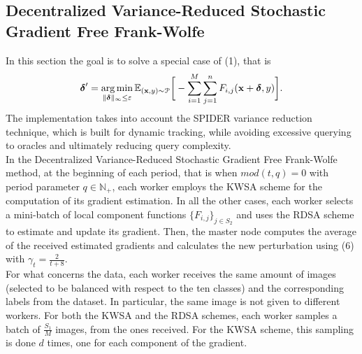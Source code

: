 \subsection{Decentralized Variance-Reduced Stochastic Gradient Free Frank-Wolfe}
In this section the goal is to solve a special case of (1), that is
\begin{equation}
	\mbox{\boldmath$ \delta$}' = \operatorname*{arg\,min}_{\lVert \mbox{\boldmath$\scriptstyle \delta$}\rVert_{\infty}\leq\varepsilon} \mathbb{E}_{(\mathbf{x},y)\sim \mathcal{P}}\bigg[-\sum_{i=1}^M \sum_{j=1}^n F_{i,j}(\mathbf{x}+\mbox{\boldmath$ \delta$},y)\bigg].
\end{equation}
The implementation takes into account the SPIDER variance reduction technique, which is built for dynamic tracking, while avoiding excessive querying to oracles and ultimately reducing query complexity.\\
In the Decentralized Variance-Reduced Stochastic Gradient Free Frank-Wolfe method,
at the beginning of each period, that is when $mod(t,q)=0$ with period parameter $q \in \mathbb{N}_{+}$, each worker employs the KWSA scheme for the computation of its gradient estimation. In all the other cases, each worker selects a mini-batch of local component functions $\{F_{i,j}\}_{j\in S_2}$ and uses the RDSA scheme to estimate and update its gradient. Then, the master node computes the average of the received estimated gradients and calculates the new perturbation using (6) with $\gamma_t = \frac{2}{t+8}$.\\
For what concerns the data, each worker receives the same amount of images (selected to be balanced with respect to the ten classes) and the corresponding labels from the dataset. In particular, the same image is not given to different workers. For both the KWSA and the RDSA schemes, each worker samples a batch of $\frac{S_1}{M}$ images, from the ones received. For the KWSA scheme, this sampling is done $d$ times, one for each component of the gradient.  
